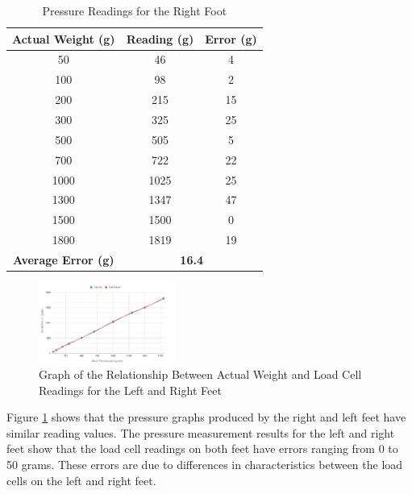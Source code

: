 \begin{enumerate}[label=\Alph*.]
        \begin{table}[h!]
            \centering
            \caption{Pressure Readings for the Right Foot}
            \begin{tabular}{|c|c|c|}
                \hline
                \textbf{Actual Weight (g)} & \textbf{Reading (g)} & \textbf{Error (g)} \\
                \hline
                50    & 46    & 4    \\
                100   & 98    & 2    \\
                200   & 215   & 15   \\
                300   & 325   & 25   \\
                500   & 505   & 5    \\
                700   & 722   & 22   \\
                1000  & 1025  & 25   \\
                1300  & 1347  & 47   \\
                1500  & 1500  & 0    \\
                1800  & 1819  & 19   \\
                \hline
                \textbf{Average Error (g)} & \multicolumn{2}{c|}{\textbf{16.4}} \\
                \hline
            \end{tabular}
            \label{tab:measurement_weight_right_foot}
        \end{table}

        \begin{figure}[h]
            \centering
            \includegraphics[width=0.4\textwidth]{gambar/chart_tekanan_kaki.png}
            \caption{Graph of the Relationship Between Actual Weight and Load Cell Readings for the Left and Right Feet}
            \label{fig:foot_pressure}
        \end{figure}

        \hspace*{1em} Figure \ref{fig:foot_pressure} shows that the pressure graphs produced by the right and left feet have similar reading values. The pressure measurement results for the left and right feet show that the load cell readings on both feet have errors ranging from 0 to 50 grams. These errors are due to differences in characteristics between the load cells on the left and right feet. 
        

\end{enumerate}
